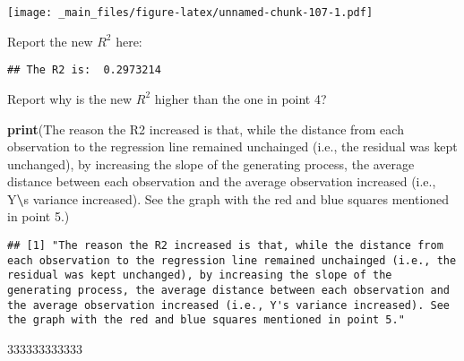 \documentclass[
]{book}
\newenvironment{Shaded}{\begin{snugshade}}{\end{snugshade}}
\newcommand{\AttributeTok}[1]{\textcolor[rgb]{0.13,0.29,0.53}{#1}}
\newcommand{\FunctionTok}[1]{\textcolor[rgb]{0.13,0.29,0.53}{\textbf{#1}}}
\newcommand{\NormalTok}[1]{#1}
\newcommand{\OtherTok}[1]{\textcolor[rgb]{0.56,0.35,0.01}{#1}}
\newcommand{\SpecialCharTok}[1]{\textcolor[rgb]{0.81,0.36,0.00}{\textbf{#1}}}
\newcommand{\StringTok}[1]{\textcolor[rgb]{0.31,0.60,0.02}{#1}}
\begin{document}
\texttt{[image: \_main\_files/figure-latex/unnamed-chunk-107-1.pdf]}

Report the new \(R^2\) here:

\begin{Shaded}
\end{Shaded}

\begin{verbatim}
## The R2 is:  0.2973214
\end{verbatim}

Report why is the new \(R^2\) higher than the one in point 4?

\begin{Shaded}
\begin{Highlighting}[]
\FunctionTok{print}\NormalTok{(}\StringTok{\textquotesingle{}The reason the R2 increased is that, while the distance from each observation to the regression line remained unchainged (i.e., the residual was kept unchanged), by increasing the slope of the generating process, the average distance between each observation and the average observation increased (i.e., Y}\SpecialCharTok{\textbackslash{}\textquotesingle{}}\StringTok{s variance increased). See the graph with the red and blue squares mentioned in point 5.\textquotesingle{}}\NormalTok{)}
\end{Highlighting}
\end{Shaded}

\begin{verbatim}
## [1] "The reason the R2 increased is that, while the distance from each observation to the regression line remained unchainged (i.e., the residual was kept unchanged), by increasing the slope of the generating process, the average distance between each observation and the average observation increased (i.e., Y's variance increased). See the graph with the red and blue squares mentioned in point 5."
\end{verbatim}

333333333333
\end{document}
